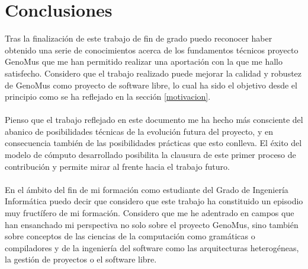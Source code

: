 \chapter{Conclusiones}

Tras la finalización de este trabajo de fin de grado puedo reconocer haber obtenido una serie de conocimientos acerca de los fundamentos técnicos proyecto GenoMus que me han permitido realizar una aportación con la que me hallo satisfecho. Considero que el trabajo realizado puede mejorar la calidad y robustez de GenoMus como proyecto de software libre, lo cual ha sido el objetivo desde el principio como se ha reflejado en la sección \ref{motivacion}.
\\ \\
Pienso que el trabajo reflejado en este documento me ha hecho más consciente del abanico de posibilidades técnicas de la evolución futura del proyecto, y en consecuencia también de las posibilidades prácticas que esto conlleva. El éxito del modelo de cómputo desarrollado posibilita la clausura de este primer proceso de contribución y permite mirar al frente hacia el trabajo futuro.
\\ \\
En el ámbito del fin de mi formación como estudiante del Grado de Ingeniería Informática puedo decir que considero que este trabajo ha constituido un episodio muy fructífero de mi formación. Considero que me he adentrado en campos que han ensanchado mi perspectiva no solo sobre el proyecto GenoMus, sino también sobre conceptos de las ciencias de la computación como gramáticas o compiladores y de la ingeniería del software como las arquitecturas heterogéneas, la gestión de proyectos o el software libre. 